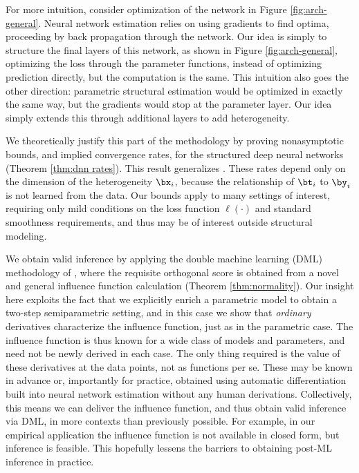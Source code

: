 \documentclass[12pt]{article}
\numberwithin{equation}{section}
\theoremstyle{definition}
\begin{document}
For more intuition, consider optimization of the network in Figure \ref{fig:arch-general}. Neural network estimation relies on using gradients to find optima, proceeding by back propagation through the network. Our idea is simply to structure the final layers of this network, as shown in Figure \ref{fig:arch-general}, optimizing the loss through the parameter functions, instead of optimizing prediction directly, but the computation is the same. This intuition also goes the other direction: parametric structural estimation would be optimized in exactly the same way, but the gradients would stop at the parameter layer. Our idea simply extends this through additional layers to add heterogeneity. 

We theoretically justify this part of the methodology by proving nonasymptotic bounds, and implied convergence rates, for the structured deep neural networks (Theorem \ref{thm:dnn rates}). This result generalizes \cite{Farrell-Liang-Misra2021_Ecma}. These rates depend only on the dimension of the heterogeneity $\bx_i$, because the relationship of $\bt_i$ to $\by_i$ is not learned from the data. Our bounds apply to many settings of interest, requiring only mild conditions on the loss function $\ell(\cdot)$ and standard smoothness requirements, and thus may be of interest outside structural modeling. 


We obtain valid inference by applying the double machine learning (DML) methodology of \cite{Chernozhukov-etal2018_EJ}, where the requisite orthogonal score is obtained from a novel and general influence function calculation (Theorem \ref{thm:normality}). Our insight here exploits the fact that we explicitly enrich a parametric model to obtain a two-step semiparametric setting, and in this case we show that \emph{ordinary} derivatives characterize the influence function, just as in the parametric case. The influence function is thus known for a wide class of models and parameters, and need not be newly derived in each case. The only thing required is the value of these derivatives at the data points, not as functions per se. These may be known in advance or, importantly for practice, obtained using automatic differentiation built into neural network estimation without any human derivations. Collectively, this means we can deliver the influence function, and thus obtain valid inference via DML, in more contexts than previously possible. For example, in our empirical application the influence function is not available in closed form, but inference is feasible. This hopefully lessens the barriers to obtaining post-ML inference in practice.
\end{document}
